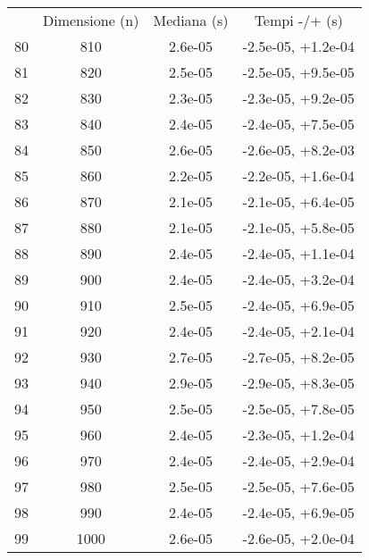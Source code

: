 \begin{table}
\centering
\begin{adjustbox}{width=1\textwidth/2}
\begin{tabular}{|c|c|c|c|}
\hline
 & Dimensione (n) & Mediana (s) & Tempi -/+ (s) \\
80 & 810 & 2.6e-05 & -2.5e-05, +1.2e-04 \\
\cline{1-4}
81 & 820 & 2.5e-05 & -2.5e-05, +9.5e-05 \\
\cline{1-4}
82 & 830 & 2.3e-05 & -2.3e-05, +9.2e-05 \\
\cline{1-4}
83 & 840 & 2.4e-05 & -2.4e-05, +7.5e-05 \\
\cline{1-4}
84 & 850 & 2.6e-05 & -2.6e-05, +8.2e-03 \\
\cline{1-4}
85 & 860 & 2.2e-05 & -2.2e-05, +1.6e-04 \\
\cline{1-4}
86 & 870 & 2.1e-05 & -2.1e-05, +6.4e-05 \\
\cline{1-4}
87 & 880 & 2.1e-05 & -2.1e-05, +5.8e-05 \\
\cline{1-4}
88 & 890 & 2.4e-05 & -2.4e-05, +1.1e-04 \\
\cline{1-4}
89 & 900 & 2.4e-05 & -2.4e-05, +3.2e-04 \\
\cline{1-4}
90 & 910 & 2.5e-05 & -2.4e-05, +6.9e-05 \\
\cline{1-4}
91 & 920 & 2.4e-05 & -2.4e-05, +2.1e-04 \\
\cline{1-4}
92 & 930 & 2.7e-05 & -2.7e-05, +8.2e-05 \\
\cline{1-4}
93 & 940 & 2.9e-05 & -2.9e-05, +8.3e-05 \\
\cline{1-4}
94 & 950 & 2.5e-05 & -2.5e-05, +7.8e-05 \\
\cline{1-4}
95 & 960 & 2.4e-05 & -2.3e-05, +1.2e-04 \\
\cline{1-4}
96 & 970 & 2.4e-05 & -2.4e-05, +2.9e-04 \\
\cline{1-4}
97 & 980 & 2.5e-05 & -2.5e-05, +7.6e-05 \\
\cline{1-4}
98 & 990 & 2.4e-05 & -2.4e-05, +6.9e-05 \\
\cline{1-4}
99 & 1000 & 2.6e-05 & -2.6e-05, +2.0e-04 \\
\cline{1-4}
\end{tabular}
\end{adjustbox}
\end{table}
